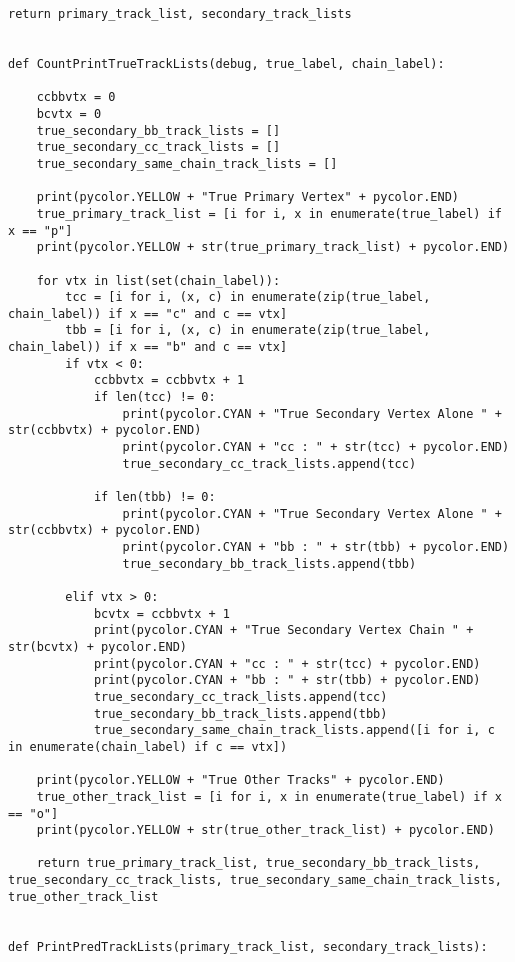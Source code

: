 \begin{lstlisting}[caption=崩壊点検出アルゴリズム用関数,label=VertexFinder1]
    return primary_track_list, secondary_track_lists


def CountPrintTrueTrackLists(debug, true_label, chain_label):

    ccbbvtx = 0
    bcvtx = 0
    true_secondary_bb_track_lists = []
    true_secondary_cc_track_lists = []
    true_secondary_same_chain_track_lists = []

    print(pycolor.YELLOW + "True Primary Vertex" + pycolor.END)
    true_primary_track_list = [i for i, x in enumerate(true_label) if x == "p"]
    print(pycolor.YELLOW + str(true_primary_track_list) + pycolor.END)

    for vtx in list(set(chain_label)):
        tcc = [i for i, (x, c) in enumerate(zip(true_label, chain_label)) if x == "c" and c == vtx]
        tbb = [i for i, (x, c) in enumerate(zip(true_label, chain_label)) if x == "b" and c == vtx]
        if vtx < 0:
            ccbbvtx = ccbbvtx + 1
            if len(tcc) != 0:
                print(pycolor.CYAN + "True Secondary Vertex Alone " + str(ccbbvtx) + pycolor.END)
                print(pycolor.CYAN + "cc : " + str(tcc) + pycolor.END)
                true_secondary_cc_track_lists.append(tcc)
                
            if len(tbb) != 0:
                print(pycolor.CYAN + "True Secondary Vertex Alone " + str(ccbbvtx) + pycolor.END)
                print(pycolor.CYAN + "bb : " + str(tbb) + pycolor.END)
                true_secondary_bb_track_lists.append(tbb)

        elif vtx > 0:
            bcvtx = ccbbvtx + 1
            print(pycolor.CYAN + "True Secondary Vertex Chain " + str(bcvtx) + pycolor.END)
            print(pycolor.CYAN + "cc : " + str(tcc) + pycolor.END)
            print(pycolor.CYAN + "bb : " + str(tbb) + pycolor.END)
            true_secondary_cc_track_lists.append(tcc)
            true_secondary_bb_track_lists.append(tbb)
            true_secondary_same_chain_track_lists.append([i for i, c in enumerate(chain_label) if c == vtx])

    print(pycolor.YELLOW + "True Other Tracks" + pycolor.END)
    true_other_track_list = [i for i, x in enumerate(true_label) if x == "o"]
    print(pycolor.YELLOW + str(true_other_track_list) + pycolor.END)

    return true_primary_track_list, true_secondary_bb_track_lists, true_secondary_cc_track_lists, true_secondary_same_chain_track_lists, true_other_track_list

        
def PrintPredTrackLists(primary_track_list, secondary_track_lists):


\end{lstlisting}
